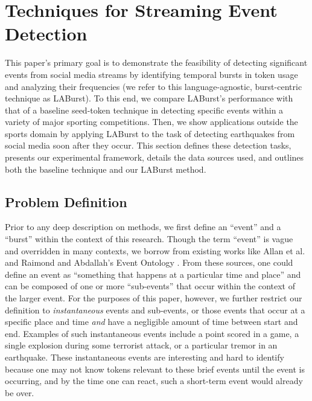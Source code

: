 \documentclass{sig-alternate}
\begin{document}
\section{Techniques for Streaming Event Detection}
\label{sect:methods}

This paper's primary goal is to demonstrate the feasibility of detecting significant events from social media streams by identifying temporal bursts in token usage and analyzing their frequencies (we refer to this language-agnostic, burst-centric technique as LABurst).
To this end, we compare LABurst's performance with that of a baseline seed-token technique in detecting specific events within a variety of major sporting competitions.
Then, we show applications outside the sports domain by applying LABurst to the task of detecting earthquakes from social media soon after they occur.
This section defines these detection tasks, presents our experimental framework, details the data sources used, and outlines both the baseline technique and our LABurst method.

\subsection{Problem Definition}

Prior to any deep description on methods, we first define an ``event'' and a ``burst'' within the context of this research.
Though the term ``event'' is vague and overridden in many contexts, we borrow from existing works like Allan et al. and Raimond and Abdallah's Event Ontology \cite{Raimond2007,allan1998line}.
From these sources, one could define an event as ``something that happens at a particular time and place'' and can be composed of one or more ``sub-events'' that occur within the context of the larger event.
For the purposes of this paper, however, we further restrict our definition to \emph{instantaneous} events and sub-events, or those events that occur at a specific place and time \emph{and} have a negligible amount of time between start and end.
Examples of such instantaneous events include a point scored in a game, a single explosion during some terrorist attack, or a particular tremor in an earthquake.
These instantaneous events are interesting and hard to identify because one may not know tokens relevant to these brief events until the event is occurring, and by the time one can react, such a short-term event would already be over. 
\end{document}
